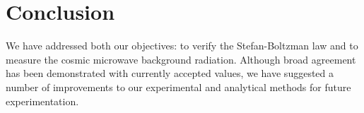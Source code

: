 \documentclass{article}%
\begin{document}
%

%
\section{Conclusion}%
\label{sec:Conclusion}%
We have addressed both our objectives: to verify the Stefan-Boltzman law and to measure the cosmic microwave background radiation.
Although broad agreement has been demonstrated with currently accepted values, we have suggested a number of improvements to our experimental and analytical methods for future experimentation. \par
%
\printbibliography
%
\end{document}
